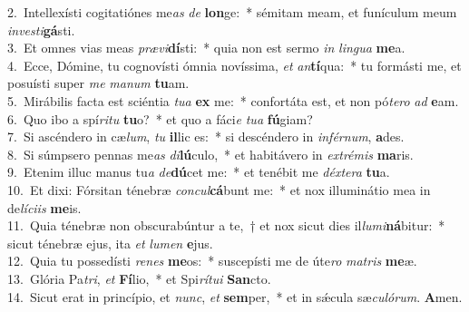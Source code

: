 {2.~}Intellexísti cogitatiónes me\textit{as} \textit{de} \textbf{lon}ge:~* sémitam meam, et funículum meum \textit{in}\textit{ve}\textit{sti}\textbf{gá}sti.\\
{3.~}Et omnes vias meas \textit{præ}\textit{vi}\textbf{dí}sti:~* quia non est sermo \textit{in} \textit{lin}\textit{gua} \textbf{me}a.\\
{4.~}Ecce, Dómine, tu cognovísti ómnia novíssima, \textit{et} \textit{an}\textbf{tí}qua:~* tu formásti me, et posuísti super \textit{me} \textit{ma}\textit{num} \textbf{tu}am.\\
{5.~}Mirábilis facta est sciéntia \textit{tu}\textit{a} \textbf{ex} me:~* confortáta est, et non pó\textit{te}\textit{ro} \textit{ad} \textbf{e}am.\\
{6.~}Quo ibo a spí\textit{ri}\textit{tu} \textbf{tu}o?~* et quo a fáci\textit{e} \textit{tu}\textit{a} \textbf{fú}giam?\\
{7.~}Si ascéndero in cæ\textit{lum}, \textit{tu} \textbf{il}lic es:~* si descéndero in \textit{in}\textit{fér}\textit{num}, \textbf{a}des.\\
{8.~}Si súmpsero pennas me\textit{as} \textit{di}\textbf{lú}culo,~* et habitávero in \textit{ex}\textit{tré}\textit{mis} \textbf{ma}ris.\\
{9.~}Etenim illuc manus tu\textit{a} \textit{de}\textbf{dú}cet me:~* et tenébit me \textit{déx}\textit{te}\textit{ra} \textbf{tu}a.\\
{10.~}Et dixi: Fórsitan ténebræ \textit{con}\textit{cul}\textbf{cá}bunt me:~* et nox illuminátio mea in de\textit{lí}\textit{ci}\textit{is} \textbf{me}is.\\
{11.~}Quia ténebræ non obscurabúntur a te,~† et nox sicut dies il\textit{lu}\textit{mi}\textbf{ná}bitur:~* sicut ténebræ ejus, ita \textit{et} \textit{lu}\textit{men} \textbf{e}jus.\\
{12.~}Quia tu possedísti \textit{re}\textit{nes} \textbf{me}os:~* suscepísti me de úte\textit{ro} \textit{ma}\textit{tris} \textbf{me}æ.\\
{13.~}Glória Pa\textit{tri}, \textit{et} \textbf{Fí}lio,~* et Spi\textit{rí}\textit{tu}\textit{i} \textbf{San}cto.\\
{14.~}Sicut erat in princípio, et \textit{nunc}, \textit{et} \textbf{sem}per,~* et in sǽcula sæ\textit{cu}\textit{ló}\textit{rum}. \textbf{A}men.\\
